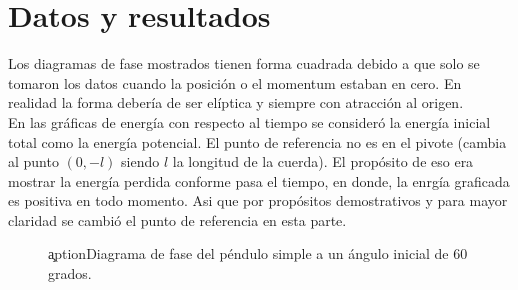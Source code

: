 \documentclass[aps,twocolumn,secnumarabic,nobalancelastpage,amsmath,amssymb,nofootinbib]{revtex4-1}
\begin{document}
	\section{Datos y resultados}
	
		Los diagramas de fase mostrados tienen forma cuadrada debido a que solo se tomaron los datos cuando la posici\'on o el momentum estaban en cero. En realidad la forma deber\'ia de ser el\'iptica y siempre con atracci\'on al origen.  \\
		\indent En las gr\'aficas de energ\'ia con respecto al tiempo se consider\'o la energ\'ia inicial total como la energ\'ia potencial. El punto de referencia no es en el pivote (cambia al punto $(0,-l)$ siendo $l$ la longitud de la cuerda). El prop\'osito de eso era mostrar la energ\'ia perdida conforme pasa el tiempo, en donde, la enrg\'ia graficada es positiva en todo momento. Asi que por prop\'ositos demostrativos y para mayor claridad se cambi\'o el punto de referencia en esta parte.  
		
			\begin{figure}[!htb]
				\c	aption{Diagrama de fase del p\'endulo simple a un \'angulo inicial de 60 grados.}
				\label{fig:DiagramaFase60}
			\end{figure} 
	
\end{document}
